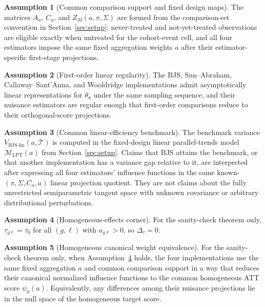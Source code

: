 \documentclass[11pt]{article}
\theoremstyle{definition}
\newtheorem{assumption}{Assumption}
\theoremstyle{plain}
\theoremstyle{remark}
\begin{document}
\begin{assumption}[Common comparison support and fixed design maps]\label{ass:design-maps}
The matrices \(A_a\), \(C_a\), and \(Z_M(a,\pi,\Sigma)\) are formed from the
comparison-set convention in Section~\ref{sec:setup}: never-treated and
not-yet-treated observations are eligible exactly when untreated for the
cohort-event cell, and all four estimators impose the same fixed aggregation
weights \(a\) after their estimator-specific first-stage projections.
\end{assumption}

\begin{assumption}[First-order linear regularity]\label{ass:regular}
The BJS, Sun--Abraham, Callaway--Sant'Anna, and Wooldridge implementations admit
asymptotically linear representations for \(\theta_a\) under the same sampling
sequence, and their nuisance estimators are regular enough that first-order
comparisons reduce to their orthogonal-score projections.
\end{assumption}

\begin{assumption}[Common linear-efficiency benchmark]\label{ass:eif-model}
The benchmark variance \(V_{\mathrm{BJS}\text{-}\mathrm{lin}}(a,\mathcal T)\)
is computed in the fixed-design linear parallel-trends model
\(\mathcal M_{\mathrm{LPT}}(a)\) from Section~\ref{sec:setup}.  Claims that BJS
attains the benchmark, or that another implementation has a variance gap
relative to it, are interpreted after expressing all four estimators'
influence functions in the same known-\((\pi,\Sigma,C_a,a)\) linear projection
quotient.  They are not claims about the fully unrestricted semiparametric
tangent space with unknown covariance or arbitrary distributional
perturbations.
\end{assumption}

\begin{assumption}[Homogeneous-effects corner]\label{ass:homogeneous}
For the sanity-check theorem only, \(\tau_{g\ell}=\tau_0\) for all
\((g,\ell)\) with \(a_{g\ell}>0\), so \(\Delta_\tau=0\).
\end{assumption}

\begin{assumption}[Homogeneous canonical weight equivalence]\label{ass:homogeneous-weights}
For the sanity-check theorem only, when Assumption~\ref{ass:homogeneous} holds,
the four implementations use the same fixed aggregation \(a\) and common
comparison support in a way that reduces their canonical normalized influence
functions to the common homogeneous ATT score \(\psi_0(a)\).  Equivalently, any
differences among their nuisance projections lie in the null space of the
homogeneous target score.
\end{assumption}
\end{document}
